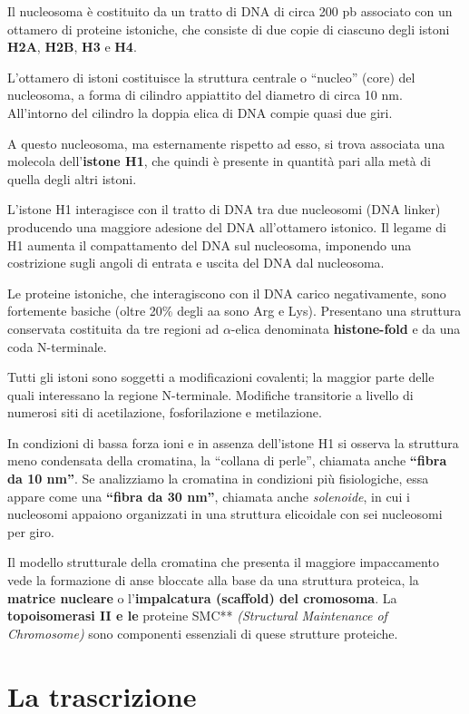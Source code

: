 \documentclass[11pt]{book}
\begin{document}
Il nucleosoma è costituito da un tratto di DNA di circa 200 pb associato
con un ottamero di proteine istoniche, che consiste di due copie di
ciascuno degli istoni \textbf{H2A}, \textbf{H2B}, \textbf{H3} e
\textbf{H4}.

L'ottamero di istoni costituisce la struttura centrale o ``nucleo''
(core) del nucleosoma, a forma di cilindro appiattito del diametro di
circa 10 nm. All'intorno del cilindro la doppia elica di DNA compie
quasi due giri.

A questo nucleosoma, ma esternamente rispetto ad esso, si trova
associata una molecola dell'\textbf{istone H1}, che quindi è presente in
quantità pari alla metà di quella degli altri istoni.

L'istone H1 interagisce con il tratto di DNA tra due nucleosomi (DNA
linker) producendo una maggiore adesione del DNA all'ottamero istonico.
Il legame di H1 aumenta il compattamento del DNA sul nucleosoma,
imponendo una costrizione sugli angoli di entrata e uscita del DNA dal
nucleosoma.

Le proteine istoniche, che interagiscono con il DNA carico
negativamente, sono fortemente basiche (oltre 20\% degli aa sono Arg e
Lys). Presentano una struttura conservata costituita da tre regioni ad
\(\alpha\)-elica denominata \textbf{histone-fold} e da una coda
N-terminale.

Tutti gli istoni sono soggetti a modificazioni covalenti; la maggior
parte delle quali interessano la regione N-terminale. Modifiche
transitorie a livello di numerosi siti di acetilazione, fosforilazione e
metilazione.

In condizioni di bassa forza ioni e in assenza dell'istone H1 si osserva
la struttura meno condensata della cromatina, la ``collana di perle'',
chiamata anche \textbf{``fibra da 10 nm''}. Se analizziamo la cromatina
in condizioni più fisiologiche, essa appare come una \textbf{``fibra da
30 nm''}, chiamata anche \emph{solenoide}, in cui i nucleosomi appaiono
organizzati in una struttura elicoidale con sei nucleosomi per giro.

Il modello strutturale della cromatina che presenta il maggiore
impaccamento vede la formazione di anse bloccate alla base da una
struttura proteica, la \textbf{matrice nucleare} o l'\textbf{impalcatura
(scaffold) del cromosoma}. La \textbf{topoisomerasi II e le }proteine
SMC** \emph{(Structural Maintenance of Chromosome)} sono componenti
essenziali di quese strutture proteiche.

\section{La trascrizione}\label{la-trascrizione}
\end{document}

